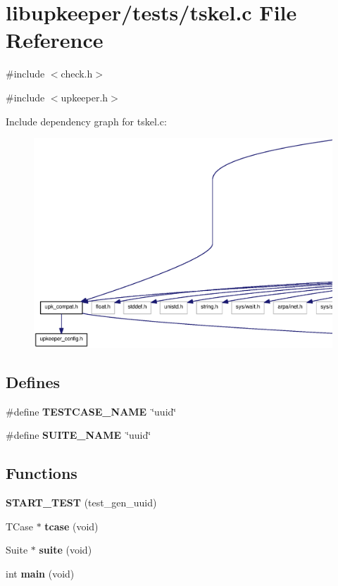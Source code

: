 \section{libupkeeper/tests/tskel.c File Reference}
\label{tskel_8c}
{\ttfamily \#include $<$check.h$>$}\par
{\ttfamily \#include $<$upkeeper.h$>$}\par
Include dependency graph for tskel.c:\nopagebreak
\begin{figure}[H]
\begin{center}
\leavevmode
\includegraphics[width=400pt]{tskel_8c__incl}
\end{center}
\end{figure}
\subsection*{Defines}
\begin{DoxyCompactItemize}
\item 
\#define {\bf TESTCASE\_\-NAME}~\char`\"{}uuid\char`\"{}
\item 
\#define {\bf SUITE\_\-NAME}~\char`\"{}uuid\char`\"{}
\end{DoxyCompactItemize}
\subsection*{Functions}
\begin{DoxyCompactItemize}
\item 
{\bf START\_\-TEST} (test\_\-gen\_\-uuid)
\item 
TCase $\ast$ {\bf tcase} (void)
\item 
Suite $\ast$ {\bf suite} (void)
\item 
int {\bf main} (void)
\end{DoxyCompactItemize}
